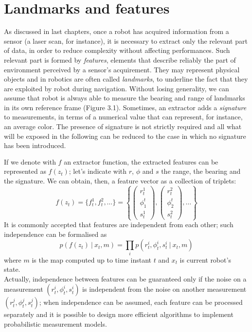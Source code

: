 \documentclass[a4paper, onecolumn]{report}
\begin{document}
\section{Landmarks and features}
As discussed in last chapters, once a robot has acquired information from a sensor (a laser scan, for instance), it is necessary to extract only the relevant part of data, in order to reduce complexity without affecting performances. Such relevant part is formed by \emph{features}, elements that describe reliably the part of environment perceived by a sensor's acquirement. They may represent physical objects and in robotics are often called \emph{landmarks}, to underline the fact that they are exploited by robot during navigation. Without losing generality, we can assume that robot is always able to measure the bearing and range of landmarks in its own reference frame (Figure 3.1). Sometimes, an extractor adds a \emph{signature} to measurements, in terms of a numerical value that can represent, for instance, an average color. The presence of signature is not strictly required and all what will be exposed in the following can be reduced to the case in which no signature has been introduced.

If we denote with $f$ an extractor function, the extracted features can be represented as $f(z_t)$; let's indicate with $r$, $\phi$ and $s$ the range, the bearing and the signature. We can obtain, then, a feature vector as a collection of triplets:
\begin{equation}
	f(z_t) = \{f_t^1, f_t^2, \dots \} =\left \{ \left( \begin{matrix} r_t^1 \\ \phi_1^t \\ s_t^1 \end{matrix} \right),  \left(\begin{matrix} r_t^2 \\ \phi_2^t \\ s_t^2 \end{matrix} \right), \dots \right\}
\end{equation}
It is commonly accepted that features are independent from each other; such independence can be formalised as
\begin{equation}
	p(f(z_t) \: | \: x_t, m) = \prod_i p(r_t^i, \phi_t^i, s_t^i \: | \: x_t, m)
\end{equation}
where $m$ is the map computed up to time instant $t$ and $x_t$ is current robot's state. \\
Actually, independence between features can be guaranteed only if the noise on a measurement $(r_t^i, \phi_t^i, s_t^i)$ is independent from the noise on another measurement $(r_t^j, \phi_t^j, s_t^j)$; when independence can be assumed, each feature can be processed separately and it is possible to design more efficient algorithms to implement probabilistic measurement models. 
\end{document}
